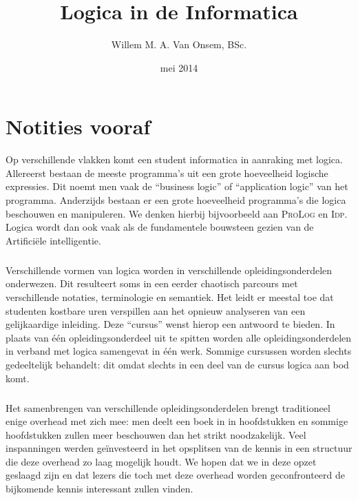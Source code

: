 \documentclass[titlepage,a4paper]{book}
\title{Logica in de Informatica}
\author{Willem M. A. Van Onsem, BSc.}
\date{mei 2014}
\newcommand{\prolog}{\textsc{ProLog}}
\newcommand{\idp}{\textsc{Idp}}
\theoremstyle{definition}
\theoremstyle{remark}
\begin{document}
\frontmatter
\begin{titlepage}
\maketitle
\end{titlepage}
\tableofcontents
\chapter*{Notities vooraf}
Op verschillende vlakken komt een student informatica in aanraking met logica. Allereerst bestaan de meeste programma's uit een grote hoeveelheid logische expressies. Dit noemt men vaak de ``business logic'' of ``application logic'' van het programma. Anderzijds bestaan er een grote hoeveelheid programma's die logica beschouwen en manipuleren. We denken hierbij bijvoorbeeld aan \prolog{} en \idp{}. Logica wordt dan ook vaak als de fundamentele bouwsteen gezien van de Artifici\"ele intelligentie.
\paragraph{}
Verschillende vormen van logica worden in verschillende opleidingsonderdelen onderwezen. Dit resulteert soms in een eerder chaotisch parcours met verschillende notaties, terminologie en semantiek. Het leidt er meestal toe dat studenten kostbare uren verspillen aan het opnieuw analyseren van een gelijkaardige inleiding. Deze ``cursus'' wenst hierop een antwoord te bieden. In plaats van \'e\'en opleidingsonderdeel uit te spitten worden alle opleidingsonderdelen in verband met logica samengevat in \'e\'en werk. Sommige cursussen worden slechts gedeeltelijk behandelt: dit omdat slechts in een deel van de cursus logica aan bod komt.
\paragraph{}
Het samenbrengen van verschillende opleidingsonderdelen brengt traditioneel enige overhead met zich mee: men deelt een boek in in hoofdstukken en sommige hoofdstukken zullen meer beschouwen dan het strikt noodzakelijk. Veel inspanningen werden ge\"investeerd in het opsplitsen van de kennis in een structuur die deze overhead zo laag mogelijk houdt. We hopen dat we in deze opzet geslaagd zijn en dat lezers die toch met deze overhead worden geconfronteerd de bijkomende kennis interessant zullen vinden.
\end{document}
